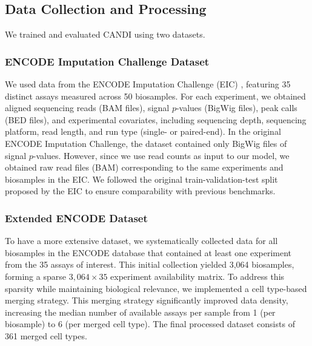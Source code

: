 \label{methods}
\subsection{Data Collection and Processing}

We trained and evaluated CANDI using two datasets.

\subsubsection{ENCODE Imputation Challenge Dataset}
We used data from the ENCODE Imputation Challenge (EIC) \cite{schreiber2023encode}, featuring 35 distinct assays measured across 50 biosamples. For each experiment, we obtained aligned sequencing reads (BAM files), signal $p$-values (BigWig files), peak calls (BED files), and experimental covariates, including sequencing depth, sequencing platform, read length, and run type (single- or paired-end). In the original ENCODE Imputation Challenge, the dataset contained only BigWig files of signal $p$-values. However, since we use read counts as input to our model, we obtained raw read files (BAM) corresponding to the same experiments and biosamples in the EIC. We followed the original train-validation-test split proposed by the EIC to ensure comparability with previous benchmarks.

\subsubsection{Extended ENCODE Dataset}

To have a more extensive dataset, we systematically collected data for all biosamples in the ENCODE database that contained at least one experiment from the 35 assays of interest. This initial collection yielded 3,064 biosamples, forming a sparse $3{,}064 \times 35$ experiment availability matrix. To address this sparsity while maintaining biological relevance, we implemented a cell type-based merging strategy. This merging strategy significantly improved data density, increasing the median number of available assays per sample from 1 (per biosample) to 6 (per merged cell type). The final processed dataset consists of 361 merged cell types.


